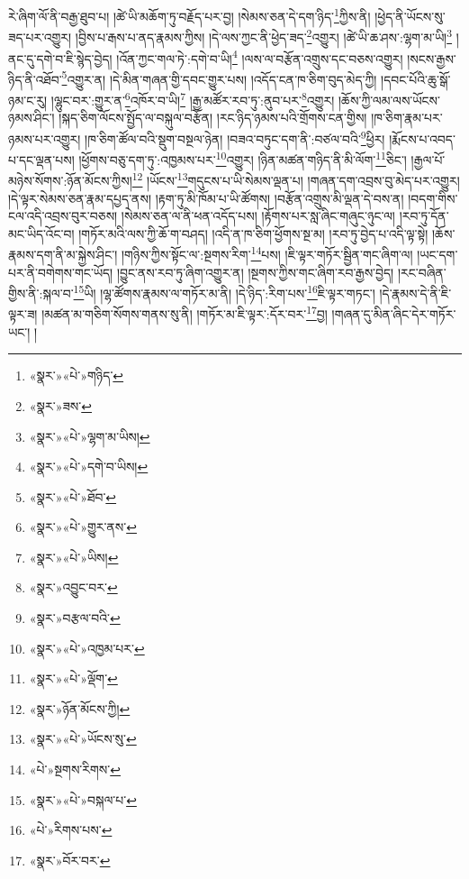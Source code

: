 རེ་ཞིག་ལོ་ནི་བརྒྱ་ཐུབ་པ། །ཚེ་ཡི་མཆོག་ཏུ་བརྗོད་པར་བྱ། །སེམས་ཅན་དེ་དག་ཉིད་\footnote{«སྣར་»«པེ་»གཉིད་}ཀྱིས་ནི། །ཕྱེད་ནི་ཡོངས་སུ་ཟད་པར་འགྱུར། །བྱིས་པ་རྒས་པ་ནད་རྣམས་ཀྱིས། །དེ་ལས་ཀྱང་ནི་ཕྱེད་ཟད་\footnote{«སྣར་»ཟས་}འགྱུར། །ཚེ་ཡི་ཆ་ཤས་:ལྷག་མ་ཡི།\footnote{«སྣར་»«པེ་»ལྷག་མ་ཡིས།} །ནང་དུ་དགེ་བ་ཇི་སྙེད་བྱེད། །འོན་ཀྱང་གལ་ཏེ་:དགེ་བ་ཡི།\footnote{«སྣར་»«པེ་»དགེ་བ་ཡིས།} །ལས་ལ་བརྩོན་འགྲུས་དང་བཅས་འགྱུར། །སངས་རྒྱས་ཉིད་ནི་འཐོབ་\footnote{«སྣར་»«པེ་»ཐོབ་}འགྱུར་ན། །དེ་མིན་གཞན་གྱི་དབང་གྱུར་པས། །འདོད་ངན་ཁ་ཅིག་བུད་མེད་ཀྱི། །དབང་པོའི་ཆུ་སྒོ་ཉམ་ང་རུ། །ལྷུང་བར་:གྱུར་ན་\footnote{«སྣར་»«པེ་»གྱུར་ནས་}འཁོར་བ་ཡི།\footnote{«སྣར་»«པེ་»ཡིས།} །རྒྱ་མཚོར་རབ་ཏུ་:ནུབ་པར་\footnote{«སྣར་»འབྱུང་བར་}འགྱུར། །ཆོས་ཀྱི་ལམ་ལས་ཡོངས་ཉམས་ཤིང་། །སྐད་ཅིག་ལོངས་སྤྱོད་ལ་བསྐུལ་བརྩོན། །རང་ཉིད་ཉམས་པའི་གྲོགས་ངན་གྱིས། །ཁ་ཅིག་རྣམ་པར་ཉམས་པར་འགྱུར། །ཁ་ཅིག་ཚོལ་བའི་སྡུག་བསྔལ་ཉེན། །བཟའ་བཏུང་དག་ནི་:བཙལ་བའི་\footnote{«སྣར་»བརྩལ་བའི་}ཕྱིར། །རྨོངས་པ་འབད་པ་དང་ལྡན་པས། །ཕྱོགས་བཅུ་དག་ཏུ་:འཁྱམས་པར་\footnote{«སྣར་»«པེ་»འཁྱམ་པར་}འགྱུར། །ཉིན་མཚན་གཉིད་ནི་མི་ལོག་\footnote{«སྣར་»«པེ་»ལྡོག་}ཅིང་། །རྒྱལ་པོ་མཉེས་སོགས་:ཉོན་མོངས་ཀྱིས།\footnote{«སྣར་»ཉོན་མོངས་ཀྱི།} །ཡོངས་\footnote{«སྣར་»«པེ་»ཡོངས་སུ་}གདུངས་པ་ཡི་སེམས་ལྡན་པ། །གཞན་དག་འབྲས་བུ་མེད་པར་འགྱུར། །དེ་ལྟར་སེམས་ཅན་རྣམ་དཔྱད་ནས། །རྟག་ཏུ་མི་ཁོམ་པ་ཡི་ཚོགས། །བརྩོན་འགྲུས་མི་ལྡན་དེ་བས་ན། །བདག་གིས་ངལ་འདི་འབྲས་བུར་བཅས། །སེམས་ཅན་ལ་ནི་ཕན་འདོད་པས། །རྟོགས་པར་སླ་ཞིང་གཞུང་ཉུང་ལ། །རབ་ཏུ་དོན་མང་ཡིད་འོང་བ། །གཏོར་མའི་ལས་ཀྱི་ཆོ་ག་བཤད། །འདི་ན་ཁ་ཅིག་ཕྱོགས་སྔ་མ། །རབ་ཏུ་བྱེད་པ་འདི་ལྟ་སྟེ། །ཆོས་རྣམས་དག་ནི་མ་སྐྱེས་ཤིང་། །གཉིས་ཀྱིས་སྟོང་ལ་:སྔགས་རིག་\footnote{«པེ་»སྔགས་རིགས་}པས། །ཇི་ལྟར་གཏོར་སྦྱིན་གང་ཞིག་ལ། །ཡང་དག་པར་ནི་བགེགས་གང་ཡོད། །བྱུང་ནས་རབ་ཏུ་ཞིག་འགྱུར་ན། །སྔགས་ཀྱིས་གང་ཞིག་རབ་རྒྱས་བྱེད། །རང་བཞིན་གྱིས་ནི་:སྐལ་བ་\footnote{«སྣར་»«པེ་»བསྐལ་པ་}ཡི། །ལྷ་ཚོགས་རྣམས་ལ་གཏོར་མ་ནི། །དེ་ཉིད་:རིག་པས་\footnote{«པེ་»རིགས་པས་}ཇི་ལྟར་གཏང་། །དེ་རྣམས་དེ་ནི་ཇི་ལྟར་ཟ། །མཚན་མ་གཅིག་སོགས་གནས་སུ་ནི། །གཏོར་མ་ཇི་ལྟར་:དོར་བར་\footnote{«སྣར་»བོར་བར་}བྱ། །གཞན་དུ་མིན་ཞིང་དེར་གཏོར་ཡང་། །
